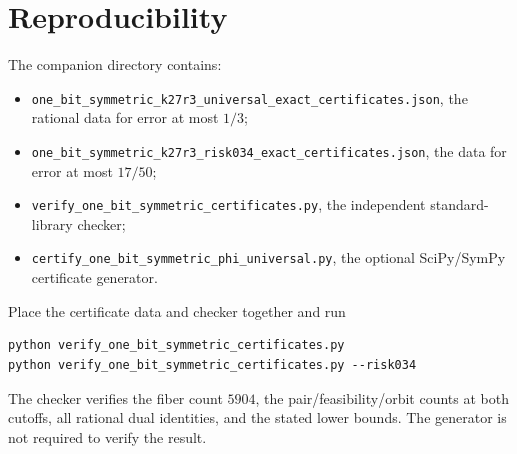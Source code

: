 \documentclass[11pt]{article}
\begin{document}
\section{Reproducibility}
The companion directory contains:
\begin{itemize}
\item \texttt{one\_bit\_symmetric\_k27r3\_universal\_exact\_certificates.json}, the rational data for error at most $1/3$;
\item \texttt{one\_bit\_symmetric\_k27r3\_risk034\_exact\_certificates.json}, the data for error at most $17/50$;
\item \texttt{verify\_one\_bit\_symmetric\_certificates.py}, the independent standard-library checker;
\item \texttt{certify\_one\_bit\_symmetric\_phi\_universal.py}, the optional SciPy/SymPy certificate generator.
\end{itemize}
Place the certificate data and checker together and run
\begin{verbatim}
python verify_one_bit_symmetric_certificates.py
python verify_one_bit_symmetric_certificates.py --risk034
\end{verbatim}
The checker verifies the fiber count $5904$, the pair/feasibility/orbit counts at both cutoffs, all rational dual identities, and the stated lower bounds. The generator is not required to verify the result.
\end{document}
